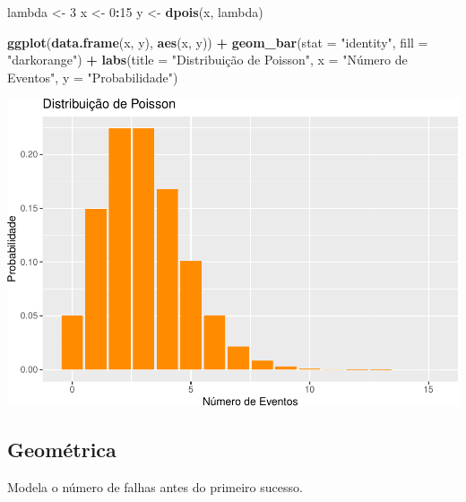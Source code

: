 \documentclass[
]{book}
\newenvironment{Shaded}{\begin{snugshade}}{\end{snugshade}}
\newcommand{\AttributeTok}[1]{\textcolor[rgb]{0.13,0.29,0.53}{#1}}
\newcommand{\DecValTok}[1]{\textcolor[rgb]{0.00,0.00,0.81}{#1}}
\newcommand{\FunctionTok}[1]{\textcolor[rgb]{0.13,0.29,0.53}{\textbf{#1}}}
\newcommand{\NormalTok}[1]{#1}
\newcommand{\OtherTok}[1]{\textcolor[rgb]{0.56,0.35,0.01}{#1}}
\newcommand{\SpecialCharTok}[1]{\textcolor[rgb]{0.81,0.36,0.00}{\textbf{#1}}}
\newcommand{\StringTok}[1]{\textcolor[rgb]{0.31,0.60,0.02}{#1}}
\begin{document}
\begin{Shaded}
\begin{Highlighting}[]
\NormalTok{lambda }\OtherTok{\textless{}{-}} \DecValTok{3}
\NormalTok{x }\OtherTok{\textless{}{-}} \DecValTok{0}\SpecialCharTok{:}\DecValTok{15}
\NormalTok{y }\OtherTok{\textless{}{-}} \FunctionTok{dpois}\NormalTok{(x, lambda)}

\FunctionTok{ggplot}\NormalTok{(}\FunctionTok{data.frame}\NormalTok{(x, y), }\FunctionTok{aes}\NormalTok{(x, y)) }\SpecialCharTok{+}
  \FunctionTok{geom\_bar}\NormalTok{(}\AttributeTok{stat =} \StringTok{"identity"}\NormalTok{, }\AttributeTok{fill =} \StringTok{"darkorange"}\NormalTok{) }\SpecialCharTok{+}
  \FunctionTok{labs}\NormalTok{(}\AttributeTok{title =} \StringTok{"Distribuição de Poisson"}\NormalTok{, }\AttributeTok{x =} \StringTok{"Número de Eventos"}\NormalTok{, }\AttributeTok{y =} \StringTok{"Probabilidade"}\NormalTok{)}
\end{Highlighting}
\end{Shaded}

\includegraphics{LivroEstatisticaR_files/figure-latex/poissonDist-1.pdf}

\subsection{Geométrica}\label{geomuxe9trica}

Modela o número de falhas antes do primeiro sucesso.
\end{document}
